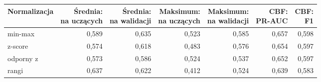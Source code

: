 \begin{tabular}{lrrrrrr}
\toprule
Normalizacja & \makecell[r]{Średnia:\\na uczących} & \makecell[r]{Średnia:\\na walidacji} & \makecell[r]{Maksimum:\\na uczących} & \makecell[r]{Maksimum:\\na walidacji} & \makecell[r]{CBF:\\PR-AUC} & \makecell[r]{CBF:\\F1} \\
\midrule
min-max & 0,589 & 0,635 & 0,523 & 0,585 & 0,657 & 0,598 \\
z-score & 0,574 & 0,618 & 0,483 & 0,576 & 0,654 & 0,597 \\
odporny z & 0,573 & 0,586 & 0,524 & 0,537 & 0,652 & 0,597 \\
rangi & 0,637 & 0,622 & 0,412 & 0,524 & 0,639 & 0,583 \\
\bottomrule
\end{tabular}
